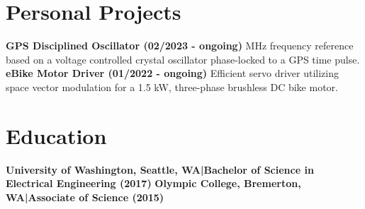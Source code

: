 \documentclass[]{article}
\begin{document}
\begin{singlespace}
\section*{Personal Projects}


\textbf{GPS Disciplined Oscillator (02/2023 - ongoing)} MHz frequency reference based on a voltage controlled crystal oscillator phase-locked to a GPS time pulse.
\textbf{eBike Motor Driver (01/2022 - ongoing)}\newline
Efficient servo driver utilizing space vector modulation for a 1.5 kW, three-phase brushless DC bike motor.

\section*{Education}

\textbf{University of Washington, Seattle, WA\hspace{3 mm}|\hspace{3 mm}Bachelor of Science in Electrical Engineering (2017)}
\vspace{-3mm}
\newline\break\textbf{Olympic College, Bremerton, WA\hspace{3 mm}|\hspace{3 mm}Associate of Science (2015)}

\end{singlespace}
\end{document}
